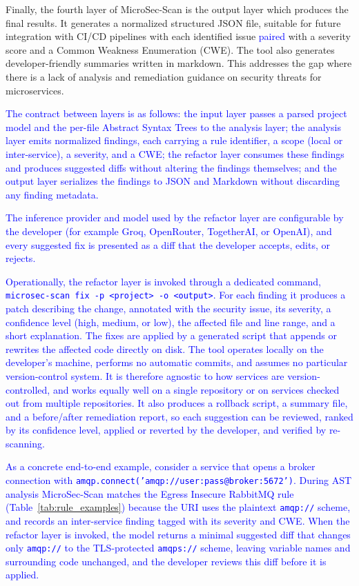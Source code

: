 \documentclass[preprint,12pt]{elsarticle}
\newcommand{\new}[1]{\textcolor{blue}{#1}}
\begin{document}
Finally, the fourth layer of MicroSec-Scan is the output layer which produces the final results. It generates a normalized structured JSON file, suitable for future integration with CI/CD pipelines with each identified issue \new{paired} with a severity score and a Common Weakness Enumeration (CWE). The tool also generates developer-friendly summaries written in markdown. This addresses the gap where there is a lack of analysis and remediation guidance on security threats for microservices. 

\new{The contract between layers is as follows: the input layer passes a parsed project model and the per-file Abstract Syntax Trees to the analysis layer; the analysis layer emits normalized findings, each carrying a rule identifier, a scope (local or inter-service), a severity, and a CWE; the refactor layer consumes these findings and produces suggested diffs without altering the findings themselves; and the output layer serializes the findings to JSON and Markdown without discarding any finding metadata.}

\new{The inference provider and model used by the refactor layer are configurable by the developer (for example Groq, OpenRouter, TogetherAI, or OpenAI), and every suggested fix is presented as a diff that the developer accepts, edits, or rejects.}

\new{Operationally, the refactor layer is invoked through a dedicated command, \texttt{microsec-scan fix -p <project> -o <output>}. For each finding it produces a patch describing the change, annotated with the security issue, its severity, a confidence level (high, medium, or low), the affected file and line range, and a short explanation. The fixes are applied by a generated script that appends or rewrites the affected code directly on disk. The tool operates locally on the developer's machine, performs no automatic commits, and assumes no particular version-control system. It is therefore agnostic to how services are version-controlled, and works equally well on a single repository or on services checked out from multiple repositories. It also produces a rollback script, a summary file, and a before/after remediation report, so each suggestion can be reviewed, ranked by its confidence level, applied or reverted by the developer, and verified by re-scanning.}

\new{As a concrete end-to-end example, consider a service that opens a broker connection with \texttt{amqp.connect('amqp://user:pass@broker:5672')}. During AST analysis MicroSec-Scan matches the Egress Insecure RabbitMQ rule (Table~\ref{tab:rule_examples}) because the URI uses the plaintext \texttt{amqp://} scheme, and records an inter-service finding tagged with its severity and CWE. When the refactor layer is invoked, the model returns a minimal suggested diff that changes only \texttt{amqp://} to the TLS-protected \texttt{amqps://} scheme, leaving variable names and surrounding code unchanged, and the developer reviews this diff before it is applied.} 
\end{document}
